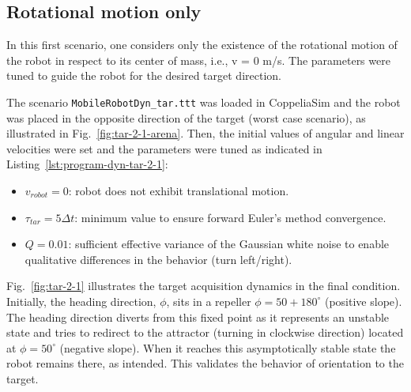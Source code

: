\subsection{Rotational motion only}%
\label{sec:robot-initially-at}
In this first scenario, one considers only the existence of the rotational
motion of the robot in respect to its center of mass, i.e., v = 0 m/s. The
parameters were tuned to guide the robot for the desired target direction.

The scenario \texttt{MobileRobotDyn\_tar.ttt} was loaded in CoppeliaSim and the
robot was placed in the opposite direction of the target (worst case scenario),
as illustrated in Fig.~\ref{fig:tar-2-1-arena}. Then, the initial values of angular
and linear velocities were set and the parameters were tuned as indicated in
Listing~\ref{lst:program-dyn-tar-2-1}:
\begin{itemize}
\item $v_{robot} = 0$: robot does not exhibit translational motion.
\item $\tau_{tar} = 5 \Delta t$: minimum value to ensure forward Euler's method convergence.
\item $Q = 0.01$: sufficient effective variance of the Gaussian white noise to
  enable qualitative differences in the behavior (turn left/right).
\end{itemize}
%

Fig.~\ref{fig:tar-2-1} illustrates the target acquisition dynamics in the final
condition. Initially, the heading direction, $\phi$, sits in a repeller $\phi =
50 + 180 ^{\circ}$ (positive slope). The heading direction diverts from this fixed point as it
represents an unstable state and tries to redirect to the attractor (turning in
clockwise direction) located at
$\phi = 50 ^{\circ}$ (negative slope). When it reaches this asymptotically
stable state the robot remains there, as intended. This validates the behavior
of orientation to the target.


